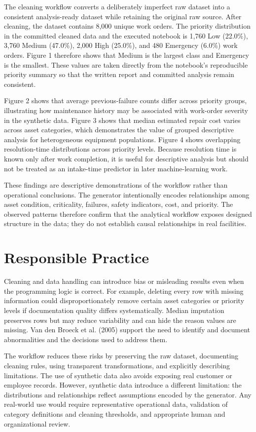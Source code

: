 \documentclass[12pt]{article}
\begin{document}
The cleaning workflow converts a deliberately imperfect raw dataset into a
consistent analysis-ready dataset while retaining the original raw source.
After cleaning, the dataset contains 8,000 unique work orders. The priority
distribution in the committed cleaned data and the executed notebook is
1,760 Low (22.0\%), 3,760 Medium (47.0\%), 2,000 High (25.0\%), and
480 Emergency (6.0\%) work orders. Figure 1 therefore shows that Medium is
the largest class and Emergency is the smallest. These values are taken
directly from the notebook's reproducible priority summary so that the
written report and committed analysis remain consistent.

Figure 2 shows that average previous-failure counts differ across priority
groups, illustrating how maintenance history may be associated with
work-order severity in the synthetic data. Figure 3 shows that median
estimated repair cost varies across asset categories, which demonstrates the
value of grouped descriptive analysis for heterogeneous equipment
populations. Figure 4 shows overlapping resolution-time distributions
across priority levels. Because resolution time is known only after work
completion, it is useful for descriptive analysis but should not be treated
as an intake-time predictor in later machine-learning work.

These findings are descriptive demonstrations of the workflow rather than
operational conclusions. The generator intentionally encodes relationships
among asset condition, criticality, failures, safety indicators, cost, and
priority. The observed patterns therefore confirm that the analytical
workflow exposes designed structure in the data; they do not establish
causal relationships in real facilities.
\section*{Responsible Practice}
Cleaning and data handling can introduce bias or misleading results even when the programming logic is correct. For example, deleting every row with missing information could disproportionately remove certain asset categories or priority levels if documentation quality differs systematically. Median imputation preserves rows but may reduce variability and can hide the reason values are missing. Van den Broeck et al. (2005) support the need to identify and document abnormalities and the decisions used to address them.

The workflow reduces these risks by preserving the raw dataset, documenting cleaning rules, using transparent transformations, and explicitly describing limitations. The use of synthetic data also avoids exposing real customer or employee records. However, synthetic data introduce a different limitation: the distributions and relationships reflect assumptions encoded by the generator. Any real-world use would require representative operational data, validation of category definitions and cleaning thresholds, and appropriate human and organizational review.
\end{document}
